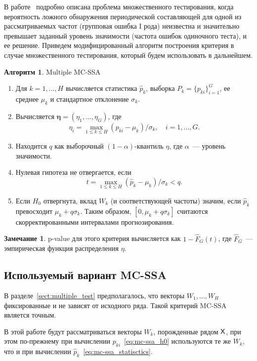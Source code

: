 \documentclass[specialist,
substylefile = spbu.rtx,
               subf,href,colorlinks=true, 12pt]{disser}
\theoremstyle{definition}
\newtheorem{algorithm}{Алгоритм}
\newtheorem{remark}{Замечание}
\begin{document}
В работе~\cite{Golyandina2023} подробно описана проблема множественного тестирования, когда вероятность ложного обнаружения периодической составляющей для одной из рассматриваемых частот (групповая ошибка I рода) неизвестна и значительно превышает заданный уровень значимости (частота ошибок одиночного теста), и ее решение. Приведем модифицированный алгоритм построения критерия в случае множественного тестирования, который будем использовать в дальнейшем.
\begin{algorithm}{Multiple MC-SSA~\cite{Golyandina2023}}\label{alg:multiple_mc-ssa}
	\begin{enumerate}
		\item Для $k=1,\dots,H$ вычисляется статистика $\widehat{p}_k$, выборка $P_k=\{p_{ki}\}_{i=1}^G$, ее среднее $\mu_k$ и стандартное отклонение $\sigma_k$.
		\item Вычисляется $\mathbf{\eta}=(\eta_1,\dots,\eta_G)$, где
		      \[
			      \eta_i=\max_{1\leqslant k\leqslant H}(p_{ki}-\mu_k)/\sigma_k,\quad i=1,\dots,G.
		      \]
		\item Находится $q$ как выборочный $(1-\alpha)$-квантиль $\eta$, где $\alpha$~--- уровень значимости.
		\item Нулевая гипотеза не отвергается, если
		      \[
			      t = \max_{1\leqslant k\leqslant H}(\widehat{p}_k-\mu_k)/\sigma_k<q.
		      \]
		\item Если $H_0$ отвергнута, вклад $W_k$ (и соответствующей частоты) значим, если $\widehat{p}_k$ превосходит $\mu_k+q\sigma_k$. Таким образом, $[0,\mu_k+q\sigma_k]$ считаются скорректированными интервалами прогнозирования.
	\end{enumerate}
\end{algorithm}

\begin{remark}
	p-value для этого критерия вычисляется как $1-\hat F_G(t)$, где $\hat F_G$~--- эмпирическая функция распределения $\eta$.
\end{remark}

\subsection{Используемый вариант MC-SSA}\label{sect:vectors_choise}
В разделе~\ref{sect:multiple_test} предполагалось, что векторы $W_1,\ldots, W_H$ фиксированные и не зависят от исходного ряда. Такой критерий MC-SSA является точным.

В этой работе будут рассматриваться векторы $W_k$, порожденные рядом $\mathsf{X}$, при этом по-прежнему при вычислении $p_{ki}$~\eqref{eq:mc-ssa_h0} используются те же $W_k$, что и при вычислении $\widehat p_k$~\eqref{eq:mc-ssa_statisctics}. 
\end{document}
